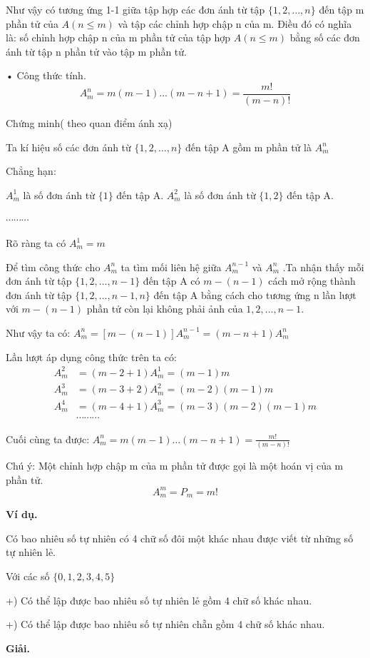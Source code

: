 \documentclass[12pt,oneside,a4paper,reqno]{book}
\begin{document}
Như vậy có tương ứng 1-1 giữa tập hợp các đơn ánh từ tập $\{1,2,…,n\}$ đến tập m phần tử của $A( n\le m)$ và tập các chỉnh hợp chập n của m. Điều đó có nghĩa là: số chỉnh hợp chập n của m phần tử của tập hợp $A(n\le m)$ bằng số các đơn ánh từ tập n phần tử vào tập m phần tử.


• Công thức tính.
$$A_m^n=m(m-1)…(m-n+1)= \frac{m!}{(m-n)!}$$

Chứng minh( theo quan điểm ánh xạ)

Ta kí hiệu số các đơn ánh từ $\{1,2,…,n\}$ đến tập A gồm m phần tử là $A_m^n$

Chẳng hạn:    

$A_m^1$  là số đơn ánh từ $\{1\}$  đến tập A.
$A_m^2$  là số đơn ánh từ $\{1,2\}$  đến tập A.

$\cdots \cdots \cdots $

Rõ ràng ta có $A_m^1=m$

Để tìm công thức cho $A_m^n$  ta tìm  mối liên hệ giữa $A_m^{n-1}$  và $A_m^n$  .Ta nhận thấy mỗi đơn ánh từ tập $\{1,2,…,n-1\}$ đến tập A có $m-(n-1)$ cách mở rộng thành đơn ánh từ tập $\{1,2,…,n-1,n\}$ đến tập A bằng cách cho tương ứng n lần lượt với $m-(n-1)$  phần tử còn lại không phải ảnh của $1,2,...,n-1.$

Như vậy ta có: $A_m^n=[m-(n-1)] A_m^{n-1}=(m-n+1) A_m^n$

Lần lượt áp dụng công thức trên ta có:
\begin{align*}
A_m^2 &= (m-2+1) A_m^1=(m-1)m\\ 
 A_m^3&=(m-3+2) A_m^2=(m-2)(m-1)m \\ 
A_m^4 &= (m-4+1)A_m^3=(m-3)(m-2)(m-1)m\\
&\cdots \cdots \cdots 
\end{align*}

Cuối cùng ta được: $A_m^n=m(m-1)…(m-n+1)=\frac{m!}{(m-n)!}$

Chú ý: Một chỉnh hợp chập m của m phần tử được gọi là một hoán vị của m phần tử.
    $$ A_m^m=P_m=m!$$

\textbf{Ví dụ.}

	 Có bao nhiêu số tự nhiên có 4 chữ số đôi một khác nhau được viết từ những số tự nhiên lẻ.
	 
	Với các số $\{0,1,2,3,4,5\}$
	
        +) Có thể lập được bao nhiêu số tự nhiên lẻ gồm 4 chữ số khác nhau.
        
        +) Có thể lập được bao nhiêu số tự nhiên chẵn gồm 4 chữ số khác nhau.
        
\textbf{Giải.}
\end{document}
